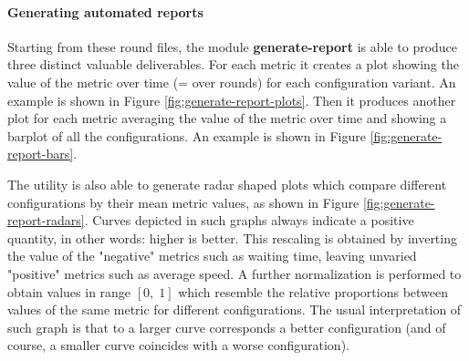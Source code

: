 \begin{table}[H]
  \label{tbl:round-file-example}
\end{table}

\paragraph{Generating automated reports}

Starting from these round files, the module \textbf{generate-report} is able to produce three distinct valuable deliverables.
For each metric it creates a plot showing the value of the metric over time (= over rounds) for each configuration variant.
An example is shown in Figure \ref{fig:generate-report-plots}.
Then it produces another plot for each metric averaging the value of the metric over time and showing a barplot of all the configurations.
An example is shown in Figure \ref{fig:generate-report-bars}.

The utility is also able to generate radar shaped plots which compare different configurations by their mean metric values, as shown in Figure \ref{fig:generate-report-radars}.
Curves depicted in such graphs always indicate a positive quantity, in other words: higher is better.
This rescaling is obtained by inverting the value of the "negative" metrics such as waiting time, leaving unvaried "positive" metrics such as average speed.
A further normalization is performed to obtain values in range $[0,\;1]$ which resemble the relative proportions between values of the same metric for different configurations.
The usual interpretation of such graph is that to a larger curve corresponds a better configuration (and of course, a smaller curve coincides with a worse configuration).

